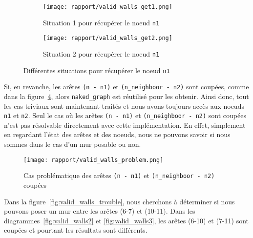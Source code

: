 \documentclass[a4paper]{article}
\begin{document}
\begin{figure}[ht]
    \centering
    \begin{subfigure}{.5\textwidth}
        \centering
        \texttt{[image: rapport/valid\_walls\_get1.png]}
        \caption{Situation 1 pour récupérer le noeud \texttt{n1}}
        \label{fig:valid_walls_get1}
    \end{subfigure}%
    \begin{subfigure}{.5\textwidth}
        \centering
        \texttt{[image: rapport/valid\_walls\_get2.png]}
        \caption{Situation 2 pour récupérer le noeud \texttt{n1}}
        \label{fig:valid_walls_get2}
    \end{subfigure}
    
    \caption{Différentes situations pour récupérer le noeud \texttt{n1}}
    \label{fig:valid_walls_get}
\end{figure}

Si, en revanche, les arêtes \texttt{(n~-~n1)} et \texttt{(n\_neighboor~-~n2)} sont coupées, comme dans la figure~\ref{fig:valid_walls_prob}, alors \texttt{naked\_graph} est réutilisé pour les obtenir. Ainsi donc, tout les cas triviaux sont maintenant traités et nous avons toujours accès aux noeuds \texttt{n1} et \texttt{n2}. Seul le cas où les arêtes \texttt{(n~-~n1)} et \texttt{(n\_neighboor~-~n2)} sont coupées n'est pas résolvable directement avec cette implémentation. En effet, simplement en regardant l'état des arêtes et des noeuds, nous ne pouvons savoir si nous sommes dans le cas d'un mur posable ou non. \\

\clearpage
\begin{figure}[ht]
    \centering
    \texttt{[image: rapport/valid\_walls\_problem.png]}
    \caption{Cas problématique des arêtes \texttt{(n - n1)} et \texttt{(n\_neighboor - n2)} coupées}
    \label{fig:valid_walls_prob}
\end{figure}

Dans la figure~\ref{fig:valid_walls_trouble}, nous cherchons à déterminer si nous pouvons poser un mur entre les arêtes (6-7) et (10-11). Dans les diagrammes~\ref{fig:valid_walls2} et \ref{fig:valid_walls3}, les arêtes (6-10) et (7-11) sont coupées et pourtant les résultats sont différents. \\
\end{document}

